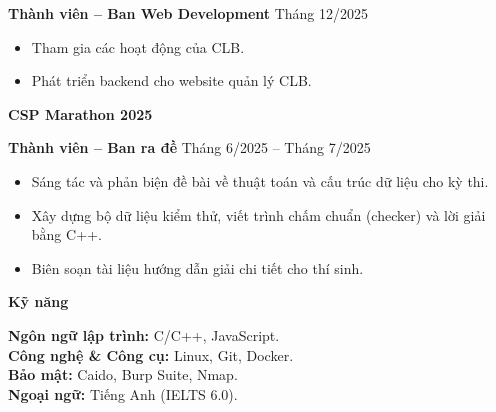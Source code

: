 \documentclass[11pt]{article}
\begin{document}
\textbf{Thành viên -- Ban Web Development} \hfill Tháng 12/2025
\begin{itemize}[noitemsep, topsep=0pt, partopsep=0pt, parsep=0pt]
    \item Tham gia các hoạt động của CLB.
    \item Phát triển backend cho website quản lý CLB.
\end{itemize}

\vspace{12pt}

\textbf{CSP Marathon 2025}

\textbf{Thành viên -- Ban ra đề} \hfill Tháng 6/2025 -- Tháng 7/2025
\begin{itemize}[noitemsep, topsep=0pt, partopsep=0pt, parsep=0pt]
    \item Sáng tác và phản biện đề bài về thuật toán và cấu trúc dữ liệu cho kỳ thi.
    \item Xây dựng bộ dữ liệu kiểm thử, viết trình chấm chuẩn (checker) và lời giải bằng C++.
    \item Biên soạn tài liệu hướng dẫn giải chi tiết cho thí sinh.
\end{itemize}

\begin{center}
    \textbf{Kỹ năng}
\end{center}

\textbf{Ngôn ngữ lập trình:} C/C++, JavaScript. \\
\textbf{Công nghệ \& Công cụ:} Linux, Git, Docker. \\
\textbf{Bảo mật:} Caido, Burp Suite, Nmap. \\
\textbf{Ngoại ngữ:} Tiếng Anh (IELTS 6.0). \\
\end{document}
